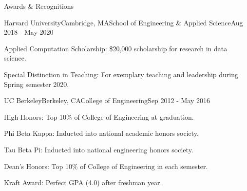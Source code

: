 \documentclass{resume} %
\begin{document}
\begin{rSection}{Awards \& Recognitions}

\begin{rSubsection}{Harvard University}{Cambridge, MA}{School of Engineering \& Applied Science}{Aug 2018 - May 2020}

\item Applied Computation Scholarship: \$20,000 scholarship for research in data science.
\item Special Distinction in Teaching: For exemplary teaching and leadership during Spring semester 2020.

\end{rSubsection}

\begin{rSubsection}{UC Berkeley}{Berkeley, CA}{College of Engineering}{Sep 2012 - May 2016}

\item High Honors: Top 10\% of College of Engineering at graduation.
\item Phi Beta Kappa: Inducted into national academic honors society.
\item Tau Beta Pi: Inducted into national engineering honors society.
\item Dean's Honors: Top 10\% of College of Engineering in each semester.
\item Kraft Award: Perfect GPA (4.0) after freshman year.

\end{rSubsection}




\end{rSection}

\end{document}
